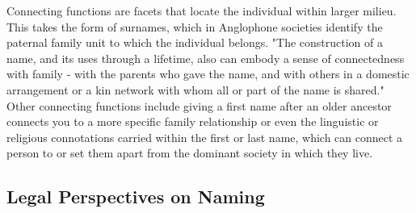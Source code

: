 Connecting functions are facets that locate the individual within larger milieu. This takes the form of surnames, which in Anglophone societies identify the paternal family unit to which the individual belongs. "The construction of a name, and its uses through a lifetime, also can embody a sense of connectedness with family - with the parents who gave the name, and with others in a domestic arrangement or a kin network with whom all or part of the name is shared." \parencite[711]{finch08} Other connecting functions include giving a first name after an older ancestor connects you to a more specific family relationship or even the linguistic or religious connotations carried within the first or last name, which can connect a person to or set them apart from the dominant society in which they live.

\subsection{Legal Perspectives on Naming}

